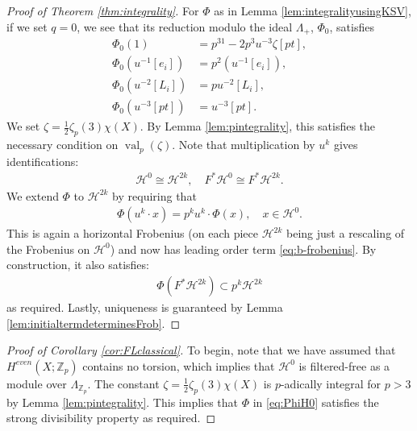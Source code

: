 \documentclass[reqno]{amsart}
\numberwithin{equation}{section}
\numberwithin{equation}{section}
\numberwithin{equation}{section}
\newtheorem{cor}[thm]{Corollary}
\theoremstyle{definition}
\theoremstyle{remark}
\theoremstyle{remark}
\newcommand{\calH}{\mathcal{H}}
\begin{document}
\begin{proof}[Proof of Theorem \ref{thm:integrality}]
     For $\Phi$ as in Lemma \ref{lem:integralityusingKSV}, if we set $q=0$, we see that its reduction modulo the ideal $\Lambda_{+}$, $\Phi_0 $, satisfies
    \begin{equation}
        \begin{aligned}
            \Phi_0(1) &= p^31 -2p^3u^{-3}\zeta[pt], \\
            \Phi_0(u^{-1}[e_i]) &= p^2(u^{-1}[e_i]), \\
            \Phi_0(u^{-2}[L_i]) &= pu^{-2}[L_i], \\
            \Phi_0(u^{-3}[pt]) &= u^{-3}[pt].
        \end{aligned}
    \end{equation}
    We set $\zeta = \frac12 \zeta_p(3)\chi(X)$. By Lemma \ref{lem:pintegrality}, this satisfies the necessary condition on $\operatorname{val}_p(\zeta)$. Note that multiplication by $u^k$ gives identifications: \begin{align}\calH^{0} \cong \calH^{2k},\quad F^*\calH^{0} \cong F^*\calH^{2k}.
    \end{align} 
   We extend $\Phi$ to $\calH^{2k}$ by requiring that \begin{align} \Phi(u^k\cdot x)=p^ku^k \cdot \Phi(x),\quad x \in \calH^{0}. \end{align}
   This is again a horizontal Frobenius (on each piece $\calH^{2k}$ being just a rescaling of the Frobenius on $\calH^{0}$) and now has leading order term  \eqref{eq:b-frobenius}. By construction, it also satisfies: \begin{align} \Phi(F^*\calH^{2k}) \subset p^k \calH^{2k} \end{align} as required. Lastly, uniqueness is guaranteed by Lemma \ref{lem:initialtermdeterminesFrob}.
\end{proof}

\begin{proof}[Proof of Corollary \ref{cor:FLclassical}] To begin, note that we have assumed that $H^{even}(X;\mathbb{Z}_p)$ contains no torsion, which implies that $\mathcal{H}^0$ is filtered-free as a module over $\Lambda_{\mathbb{Z}_p}.$ The constant $\zeta = \frac12 \zeta_p(3)\chi(X)$ is $p$-adically integral for $p>3$ by Lemma \ref{lem:pintegrality}. This implies that $\Phi$ in \eqref{eq:PhiH0} satisfies the strong divisibility property as required.  \end{proof}

\end{document}
